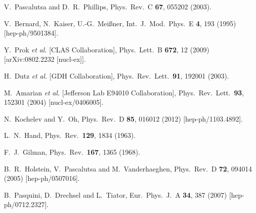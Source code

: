 \documentclass[twocolumn,prc,showpacs,nofootinbib,preprintnumbers,amsmath,amssymb,superscriptaddress]{revtex4-1}
\begin{document}
\begin{thebibliography}{99}
 V.~Pascalutsa and D.~R.~Phillips,
  Phys.\ Rev.\  C {\bf 67}, 055202 (2003).



  V.~Bernard, N.~Kaiser, U.-G.~Mei\ss ner,
  Int.\ J.\ Mod.\ Phys.\ E {\bf 4}, 193 (1995)
  [hep-ph/9501384].

 Y.~Prok {\it et al.}  [CLAS Collaboration],
  Phys.\ Lett.\ B {\bf 672}, 12 (2009)
  [arXiv:0802.2232 [nucl-ex]].

  H.~Dutz {\it et al.}  [GDH Collaboration],
  Phys.\ Rev.\ Lett.\  {\bf 91}, 192001 (2003).

  M.~Amarian {\it et al.}  [Jefferson Lab E94010 Collaboration],
  Phys.\ Rev.\ Lett.\  {\bf 93}, 152301 (2004)
  [nucl-ex/0406005].


  N.~Kochelev and Y.~Oh,
  Phys.\ Rev.\ D {\bf 85}, 016012 (2012)
  [hep-ph/1103.4892].



  L.~N.~Hand,
  Phys.\ Rev.\  {\bf 129}, 1834 (1963).

  F.~J.~Gilman,
  Phys.\ Rev.\  {\bf 167}, 1365 (1968).
  
  B.~R.~Holstein, V.~Pascalutsa and M.~Vanderhaeghen,
  Phys.\ Rev.\ D {\bf 72}, 094014 (2005)
  [hep-ph/0507016].
  
  B.~Pasquini, D.~Drechsel and L.~Tiator,
  Eur.\ Phys.\ J.\ A {\bf 34}, 387 (2007)
  [hep-ph/0712.2327].
  

\end{thebibliography}
\end{document}
